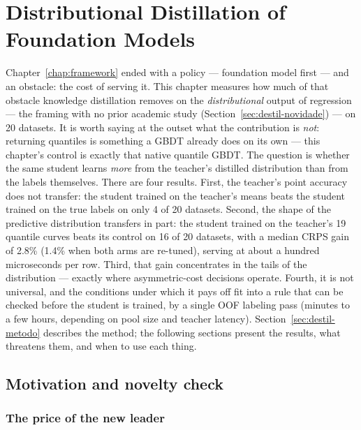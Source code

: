 \chapter{Distributional Distillation of Foundation Models}
\label{chap:destilacao}

Chapter~\ref{chap:framework} ended with a policy --- foundation model
first --- and an obstacle: the cost of serving it. This chapter
measures how much of that obstacle knowledge distillation removes on
the \emph{distributional} output of regression --- the framing with
no prior academic study (Section~\ref{sec:destil-novidade}) --- on 20
datasets. It is worth saying at the outset what the contribution is
\emph{not}: returning quantiles is something a GBDT already does on
its own --- this chapter's control is exactly that native quantile
GBDT. The question is whether the same student learns \emph{more}
from the teacher's distilled distribution than from the labels
themselves. There are four results. First, the teacher's point
accuracy does not transfer: the student trained on the teacher's
means beats the student trained on the true labels on only 4 of 20
datasets. Second, the shape of the predictive distribution transfers
in part: the student trained on the teacher's 19 quantile curves
beats its control on 16 of 20 datasets, with a median CRPS gain of
2.8\% (1.4\% when both arms are re-tuned), serving at about a hundred
microseconds per row. Third, that gain concentrates in the tails of
the distribution --- exactly where asymmetric-cost decisions operate.
Fourth, it is not universal, and the conditions under which it pays
off fit into a rule that can be checked before the student is trained,
by a single OOF labeling pass (minutes to a few hours, depending on
pool size and teacher latency).
Section~\ref{sec:destil-metodo} describes the method; the following
sections present the results, what threatens them, and when to use
each thing.

\section{Motivation and novelty check}
\label{sec:destil-motivacao}

\subsection{The price of the new leader}
\label{sec:destil-preco}

